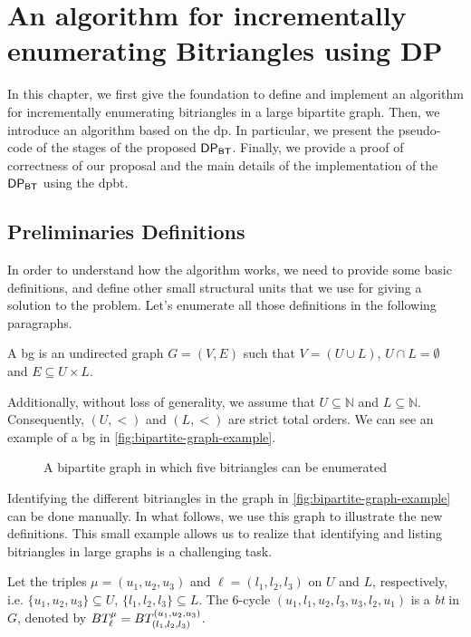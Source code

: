 \chapter[An Algorithm for Incrementally Enumerating Bitriangles]{An algorithm for incrementally enumerating Bitriangles using DP}\label{incr-algo-bt-dp}
In this chapter, we first give the foundation to define and implement an algorithm for incrementally enumerating bitriangles in a large bipartite graph. 
Then, we introduce an algorithm based on the \acrshort{dp}. In particular,  we present the pseudo-code of the stages of the proposed $\mathsf{DP_{BT}}$. 
Finally, we provide a proof of correctness of our proposal and the main details of the implementation of the $\mathsf{DP_{BT}}$ using the \acrshort{dpbt}.

\section{Preliminaries Definitions}\label{sec:prem:def}
In order to understand how the algorithm works, we need to provide some basic definitions, and define other small structural units that we use for giving a solution to the problem.
Let's enumerate all those definitions in the following paragraphs.

\begin{definition}[\acrlong{bg}] 
A \acrfull{bg} is an undirected graph $G=(V,E)$  such that $V=(U\cup L)$, $U\cap L=\emptyset$ and $E\subseteq U\times L$.
\end{definition}

Additionally, without loss of generality, we assume that  $U\subseteq \mathbb{N}$ and $L\subseteq \mathbb{N}$. Consequently, $(U,<)$  and $(L,<)$ are strict total orders. We can see an example of a \acrshort{bg}
in \autoref{fig:bipartite-graph-example}.

\begin{figure}[ht]
\centering	
{}
\caption[{[\acrshort{iebt}] Example of \acrlong{bg}}]{A bipartite graph in which five bitriangles can be enumerated}
\label{fig:bipartite-graph-example}
\end{figure}

Identifying the different bitriangles in the graph in \autoref{fig:bipartite-graph-example} can be done manually. 
In what follows, we use this graph to illustrate the new definitions. 
This small example allows us to realize that identifying and listing bitriangles in large graphs is a challenging task.

\begin{definition}[\acrlong{bt}]\label{def:bt}
Let the triples $\mu=(u_1, u_2, u_3)$ and $\ell=(l_1, l_2,l_3)$ on $U$ and $L$, respectively, i.e.  $\{u_1, u_2, u_3\} \subseteq U$, $\{l_1, l_2,l_3\} \subseteq L$. 
The 6-cycle $(u_1,l_1,u_2,l_3,u_3,l_2,u_1)$  is a \textit{\acrfull{bt}} in $G$, denoted by $BT_{\ell}^{\mu} = BT_{(l_1, l_2,l_3)}^{(u_1, u_2, u_3)}$. 
\end{definition}      

